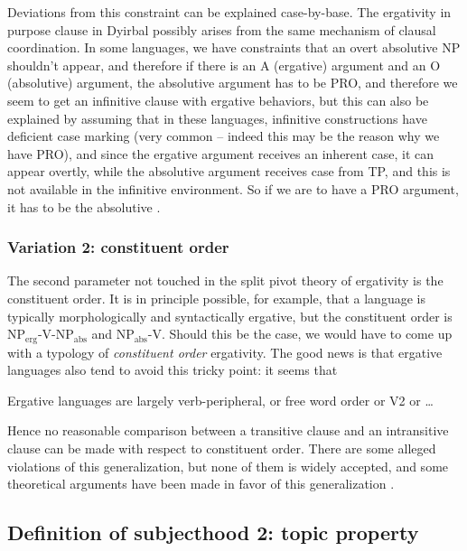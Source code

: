 \documentclass{article}
\newcommand*{\citepage}[1]{pp.~{#1}}
\begin{document}
Deviations from this constraint can be explained case-by-base.
The ergativity in purpose clause in Dyirbal possibly arises 
from the same mechanism of clausal coordination.
In some languages, we have constraints that an overt absolutive NP shouldn't appear,
and therefore if there is an A (ergative) argument and an O (absolutive) argument,
the absolutive argument has to be PRO,
and therefore we seem to get an infinitive clause with ergative behaviors,
but this can also be explained by assuming that in these languages,
infinitive constructions have deficient case marking 
(very common -- indeed this may be the reason why we have PRO),
and since the ergative argument receives an inherent case,
it can appear overtly,
while the absolutive argument receives case from TP,
and this is not available in the infinitive environment.
So if we are to have a PRO argument, 
it has to be the absolutive \citep[\citepage{19}]{aldridge2008generative}.

\subsubsection{Variation 2: constituent order}

The second parameter not touched in the split pivot theory of ergativity is the constituent order.
It is in principle possible, for example, 
that a language is typically morphologically and syntactically ergative,
but the constituent order is NP$_{\text{erg}}$-V-NP$_{\text{abs}}$ and NP$_{\text{abs}}$-V.
Should this be the case, 
we would have to come up with a typology of \emph{constituent order} ergativity.
The good news is that ergative languages also tend to avoid this tricky point: 
it seems that \citep{mahajan1994ergativity}
\begin{exe}
    \ex Ergative languages are largely verb-peripheral, or free word order or V2 or \dots
\end{exe}
Hence no reasonable comparison between a transitive clause and an intransitive clause can be made 
with respect to constituent order.
There are some alleged violations of this generalization,
but none of them is widely accepted,
and some theoretical arguments have been made in favor of this generalization \citep{lahne2008excluding}.



\subsection{Definition of subjecthood 2: topic property}
\end{document}
